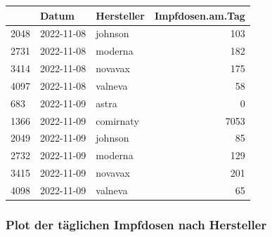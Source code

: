 \documentclass[
]{article}
\newenvironment{Shaded}{\begin{snugshade}}{\end{snugshade}}
\newcommand{\AttributeTok}[1]{\textcolor[rgb]{0.77,0.63,0.00}{#1}}
\newcommand{\DecValTok}[1]{\textcolor[rgb]{0.00,0.00,0.81}{#1}}
\newcommand{\FunctionTok}[1]{\textcolor[rgb]{0.00,0.00,0.00}{#1}}
\newcommand{\NormalTok}[1]{#1}
\newcommand{\OtherTok}[1]{\textcolor[rgb]{0.56,0.35,0.01}{#1}}
\newcommand{\SpecialCharTok}[1]{\textcolor[rgb]{0.00,0.00,0.00}{#1}}
\newcommand{\StringTok}[1]{\textcolor[rgb]{0.31,0.60,0.02}{#1}}
\begin{document}
\begin{Shaded}
\end{Shaded}

\begin{longtable}[]{@{}lllr@{}}
\toprule()
& Datum & Hersteller & Impfdosen.am.Tag \\
\midrule()
\endhead
2048 & 2022-11-08 & johnson & 103 \\
2731 & 2022-11-08 & moderna & 182 \\
3414 & 2022-11-08 & novavax & 175 \\
4097 & 2022-11-08 & valneva & 58 \\
683 & 2022-11-09 & astra & 0 \\
1366 & 2022-11-09 & comirnaty & 7053 \\
2049 & 2022-11-09 & johnson & 85 \\
2732 & 2022-11-09 & moderna & 129 \\
3415 & 2022-11-09 & novavax & 201 \\
4098 & 2022-11-09 & valneva & 65 \\
\bottomrule()
\end{longtable}

\hypertarget{plot-der-tuxe4glichen-impfdosen-nach-hersteller}{%
\subsubsection{Plot der täglichen Impfdosen nach
Hersteller}\label{plot-der-tuxe4glichen-impfdosen-nach-hersteller}}
\end{document}
